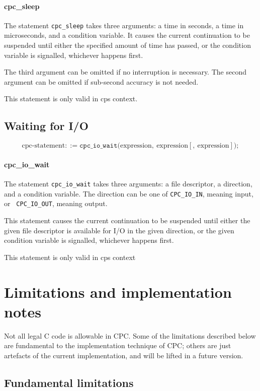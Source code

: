 \documentclass[a4paper]{report}
\begin{document}
\paragraph{cpc\_sleep} The statement {\tt cpc\_sleep} takes three
arguments: a time in seconds, a time in microseconds, and a condition
variable.  It causes the current continuation to be suspended until
either the specified amount of time has passed, or the condition
variable is signalled, whichever happens first.

The third argument can be omitted if no interruption is necessary.
The second argument can be omitted if sub-second accuracy is not
needed.

This statement is only valid in cps context.

\subsection{Waiting for I/O}
\[ \mbox{cpc-statement} ::=
   \mathtt{cpc\_io\_wait} \mathtt{(} \mbox{expression}
                                   \mathtt{,}\ \mbox{expression}
                                   [ \mathtt{,}\ \mbox{expression} ]
                         \mathtt{)} \mathtt{;}\]

\paragraph{cpc\_io\_wait} The statement {\tt cpc\_io\_wait} takes three
arguments: a file descriptor, a direction, and a condition variable.
The direction can be one of {\tt CPC\_IO\_IN}, meaning input, or {\tt
  CPC\_IO\_OUT}, meaning output.

This statement causes the current continuation to be suspended until
either the given file descriptor is available for I/O in the given
direction, or the given condition variable is signalled, whichever
happens first.

This statement is only valid in cps context

\section{Limitations and implementation notes}

Not all legal C code is allowable in CPC.  Some of the limitations
described below are fundamental to the implementation technique of
CPC; others are just artefacts of the current implementation, and will
be lifted in a future version.

\subsection{Fundamental limitations}
\end{document}
